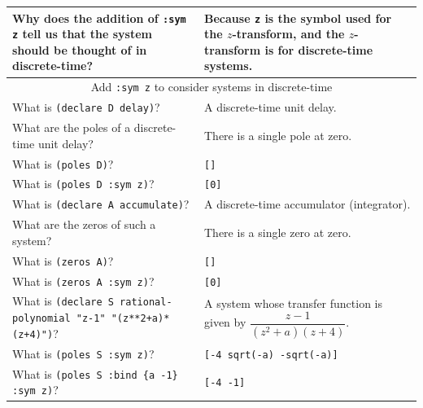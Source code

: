 \documentclass[11pt,letter]{article}
\begin{document}
\begin{longtable}{ p{} p{} }
  Why does the addition of \lstinline!:sym z! tell us that the system should be thought of in discrete-time?
  &
  Because \lstinline!z! is the symbol used for the $z$-transform, and the $z$-transform is for discrete-time systems. \\

  \midrule

  \multicolumn{2}{c}{\Large Add \lstinline!:sym z! to consider systems in discrete-time} \\

  \midrule

  What is \lstinline!(declare D delay)!?
  &
  A discrete-time unit delay. \\

  What are the poles of a discrete-time unit delay?
  &
  There is a single pole at zero. \\

  What is \lstinline!(poles D)!?
  &
  \lstinline![]! \\

  What is \lstinline!(poles D :sym z)!?
  &
  \lstinline![0]! \\

  What is \lstinline!(declare A accumulate)!?
  &
  A discrete-time accumulator (integrator). \\

  What are the zeros of such a system?
  &
  There is a single zero at zero. \\

  What is \lstinline!(zeros A)!?
  &
  \lstinline![]! \\

  What is \lstinline!(zeros A :sym z)!?
  &
  \lstinline![0]! \\

  What is \lstinline!(declare S rational-polynomial "z-1" "(z**2+a)*(z+4)")!?
  &
  A system whose transfer function is given by $\dfrac{z-1}{(z^2+a)(z+4)}$. \\

  What is \lstinline!(poles S :sym z)!?
  &
  \lstinline![-4 sqrt(-a) -sqrt(-a)]! \\

  What is \lstinline!(poles S :bind {a -1} :sym z)!?
  &
  \lstinline![-4 -1]! \\


\end{longtable}
\end{document}
